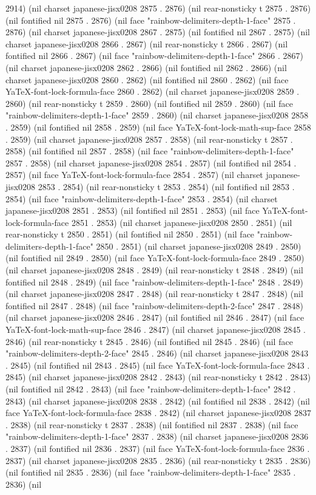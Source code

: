 2914) (nil charset japanese-jisx0208 2875 . 2876) (nil rear-nonsticky t 2875 . 2876) (nil fontified nil 2875 . 2876) (nil face "rainbow-delimiters-depth-1-face" 2875 . 2876) (nil charset japanese-jisx0208 2867 . 2875) (nil fontified nil 2867 . 2875) (nil charset japanese-jisx0208 2866 . 2867) (nil rear-nonsticky t 2866 . 2867) (nil fontified nil 2866 . 2867) (nil face "rainbow-delimiters-depth-1-face" 2866 . 2867) (nil charset japanese-jisx0208 2862 . 2866) (nil fontified nil 2862 . 2866) (nil charset japanese-jisx0208 2860 . 2862) (nil fontified nil 2860 . 2862) (nil face YaTeX-font-lock-formula-face 2860 . 2862) (nil charset japanese-jisx0208 2859 . 2860) (nil rear-nonsticky t 2859 . 2860) (nil fontified nil 2859 . 2860) (nil face "rainbow-delimiters-depth-1-face" 2859 . 2860) (nil charset japanese-jisx0208 2858 . 2859) (nil fontified nil 2858 . 2859) (nil face YaTeX-font-lock-math-sup-face 2858 . 2859) (nil charset japanese-jisx0208 2857 . 2858) (nil rear-nonsticky t 2857 . 2858) (nil fontified nil 2857 . 2858) (nil face "rainbow-delimiters-depth-1-face" 2857 . 2858) (nil charset japanese-jisx0208 2854 . 2857) (nil fontified nil 2854 . 2857) (nil face YaTeX-font-lock-formula-face 2854 . 2857) (nil charset japanese-jisx0208 2853 . 2854) (nil rear-nonsticky t 2853 . 2854) (nil fontified nil 2853 . 2854) (nil face "rainbow-delimiters-depth-1-face" 2853 . 2854) (nil charset japanese-jisx0208 2851 . 2853) (nil fontified nil 2851 . 2853) (nil face YaTeX-font-lock-formula-face 2851 . 2853) (nil charset japanese-jisx0208 2850 . 2851) (nil rear-nonsticky t 2850 . 2851) (nil fontified nil 2850 . 2851) (nil face "rainbow-delimiters-depth-1-face" 2850 . 2851) (nil charset japanese-jisx0208 2849 . 2850) (nil fontified nil 2849 . 2850) (nil face YaTeX-font-lock-formula-face 2849 . 2850) (nil charset japanese-jisx0208 2848 . 2849) (nil rear-nonsticky t 2848 . 2849) (nil fontified nil 2848 . 2849) (nil face "rainbow-delimiters-depth-1-face" 2848 . 2849) (nil charset japanese-jisx0208 2847 . 2848) (nil rear-nonsticky t 2847 . 2848) (nil fontified nil 2847 . 2848) (nil face "rainbow-delimiters-depth-2-face" 2847 . 2848) (nil charset japanese-jisx0208 2846 . 2847) (nil fontified nil 2846 . 2847) (nil face YaTeX-font-lock-math-sup-face 2846 . 2847) (nil charset japanese-jisx0208 2845 . 2846) (nil rear-nonsticky t 2845 . 2846) (nil fontified nil 2845 . 2846) (nil face "rainbow-delimiters-depth-2-face" 2845 . 2846) (nil charset japanese-jisx0208 2843 . 2845) (nil fontified nil 2843 . 2845) (nil face YaTeX-font-lock-formula-face 2843 . 2845) (nil charset japanese-jisx0208 2842 . 2843) (nil rear-nonsticky t 2842 . 2843) (nil fontified nil 2842 . 2843) (nil face "rainbow-delimiters-depth-1-face" 2842 . 2843) (nil charset japanese-jisx0208 2838 . 2842) (nil fontified nil 2838 . 2842) (nil face YaTeX-font-lock-formula-face 2838 . 2842) (nil charset japanese-jisx0208 2837 . 2838) (nil rear-nonsticky t 2837 . 2838) (nil fontified nil 2837 . 2838) (nil face "rainbow-delimiters-depth-1-face" 2837 . 2838) (nil charset japanese-jisx0208 2836 . 2837) (nil fontified nil 2836 . 2837) (nil face YaTeX-font-lock-formula-face 2836 . 2837) (nil charset japanese-jisx0208 2835 . 2836) (nil rear-nonsticky t 2835 . 2836) (nil fontified nil 2835 . 2836) (nil face "rainbow-delimiters-depth-1-face" 2835 . 2836) (nil 